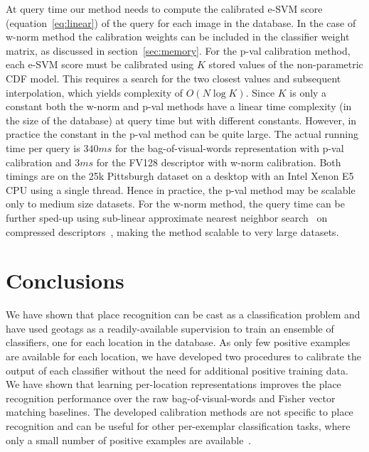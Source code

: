     {
        At query time our method needs to compute the calibrated e-SVM score (equation~\eqref{eq:linear}) of the query for each image in the database. In the case of w-norm method the calibration weights can be included in the classifier weight matrix, as discussed in section~\ref{sec:memory}. For the p-val calibration method, each e-SVM score must be calibrated using $K$ stored values of the non-parametric CDF model. This requires a search for the two closest values and subsequent interpolation, which yields complexity of $O(N\log{K})$. Since $K$ is only a constant both the w-norm and p-val methods have a linear time complexity (in the size of the database) at query time but with different constants. However, in practice the constant in the p-val method can be quite large. The actual running time per query is $340ms$ for the bag-of-visual-words representation with p-val calibration and $3ms$ for the FV128 descriptor with w-norm calibration. Both timings are on the 25k Pittsburgh dataset on a desktop with an Intel Xenon E5 CPU using a single thread.   Hence in practice, the p-val method may be scalable only to medium size datasets. For the w-norm method, the query time can be further sped-up using sub-linear approximate nearest neighbor search~\cite{Flann2014} on compressed descriptors~\cite{Jegou11}, making the method scalable to very large datasets.
    }

\section{Conclusions}
  We have shown that place recognition can be cast as a classification problem and have used geotags as a readily-available supervision to train an ensemble of classifiers, one for each location in the database. As only few positive examples are available for each location, we have developed two procedures to calibrate the output of each classifier without the need for additional positive training data. We have shown that learning per-location representations improves the place recognition performance over the raw bag-of-visual-words and Fisher vector matching baselines. The developed calibration methods are not specific to place recognition and can be useful for other per-exemplar classification tasks, where only a small number of positive examples are available~\cite{Malisiewicz11}.



